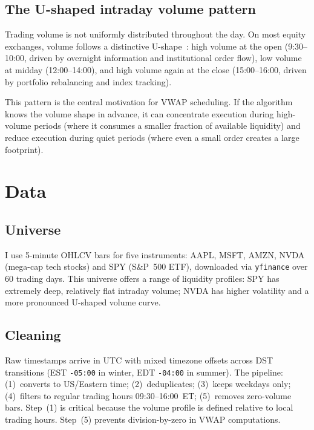 \documentclass[10pt,twocolumn]{article}
\begin{document}
\subsection{The U-shaped intraday volume pattern}

Trading volume is not uniformly distributed throughout the day. On most equity exchanges, volume follows a distinctive U-shape~\cite{admati1988, biais1995}: high volume at the open (9:30--10:00, driven by overnight information and institutional order flow), low volume at midday (12:00--14:00), and high volume again at the close (15:00--16:00, driven by portfolio rebalancing and index tracking).

This pattern is the central motivation for VWAP scheduling. If the algorithm knows the volume shape in advance, it can concentrate execution during high-volume periods (where it consumes a smaller fraction of available liquidity) and reduce execution during quiet periods (where even a small order creates a large footprint).



\section{Data}

\subsection{Universe}
I use 5-minute OHLCV bars for five instruments: AAPL, MSFT, AMZN, NVDA (mega-cap tech stocks) and SPY (S\&P~500 ETF), downloaded via \texttt{yfinance} over 60 trading days. This universe offers a range of liquidity profiles: SPY has extremely deep, relatively flat intraday volume; NVDA has higher volatility and a more pronounced U-shaped volume curve.

\subsection{Cleaning}
Raw timestamps arrive in UTC with mixed timezone offsets across DST transitions (EST \texttt{-05:00} in winter, EDT \texttt{-04:00} in summer). The pipeline: (1)~converts to US/Eastern time; (2)~deduplicates; (3)~keeps weekdays only; (4)~filters to regular trading hours 09:30--16:00~ET; (5)~removes zero-volume bars. Step~(1) is critical because the volume profile is defined relative to local trading hours. Step~(5) prevents division-by-zero in VWAP computations.
\end{document}
